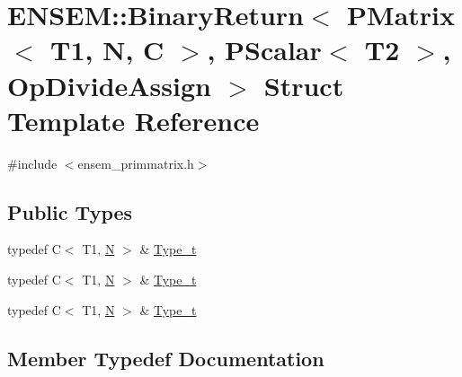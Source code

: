 \hypertarget{structENSEM_1_1BinaryReturn_3_01PMatrix_3_01T1_00_01N_00_01C_01_4_00_01PScalar_3_01T2_01_4_00_01OpDivideAssign_01_4}{}\section{E\+N\+S\+EM\+:\+:Binary\+Return$<$ P\+Matrix$<$ T1, N, C $>$, P\+Scalar$<$ T2 $>$, Op\+Divide\+Assign $>$ Struct Template Reference}
\label{structENSEM_1_1BinaryReturn_3_01PMatrix_3_01T1_00_01N_00_01C_01_4_00_01PScalar_3_01T2_01_4_00_01OpDivideAssign_01_4}


{\ttfamily \#include $<$ensem\+\_\+primmatrix.\+h$>$}

\subsection*{Public Types}
\begin{DoxyCompactItemize}
\item 
typedef C$<$ T1, \mbox{\hyperlink{adat__devel_2lib_2hadron_2operator__name__util_8cc_a7722c8ecbb62d99aee7ce68b1752f337}{N}} $>$ \& \mbox{\hyperlink{structENSEM_1_1BinaryReturn_3_01PMatrix_3_01T1_00_01N_00_01C_01_4_00_01PScalar_3_01T2_01_4_00_01OpDivideAssign_01_4_ac3253c10538bb9a04527c21d4b2ce701}{Type\+\_\+t}}
\item 
typedef C$<$ T1, \mbox{\hyperlink{adat__devel_2lib_2hadron_2operator__name__util_8cc_a7722c8ecbb62d99aee7ce68b1752f337}{N}} $>$ \& \mbox{\hyperlink{structENSEM_1_1BinaryReturn_3_01PMatrix_3_01T1_00_01N_00_01C_01_4_00_01PScalar_3_01T2_01_4_00_01OpDivideAssign_01_4_ac3253c10538bb9a04527c21d4b2ce701}{Type\+\_\+t}}
\item 
typedef C$<$ T1, \mbox{\hyperlink{adat__devel_2lib_2hadron_2operator__name__util_8cc_a7722c8ecbb62d99aee7ce68b1752f337}{N}} $>$ \& \mbox{\hyperlink{structENSEM_1_1BinaryReturn_3_01PMatrix_3_01T1_00_01N_00_01C_01_4_00_01PScalar_3_01T2_01_4_00_01OpDivideAssign_01_4_ac3253c10538bb9a04527c21d4b2ce701}{Type\+\_\+t}}
\end{DoxyCompactItemize}


\subsection{Member Typedef Documentation}
\mbox{\label{structENSEM_1_1BinaryReturn_3_01PMatrix_3_01T1_00_01N_00_01C_01_4_00_01PScalar_3_01T2_01_4_00_01OpDivideAssign_01_4_ac3253c10538bb9a04527c21d4b2ce701}} 
